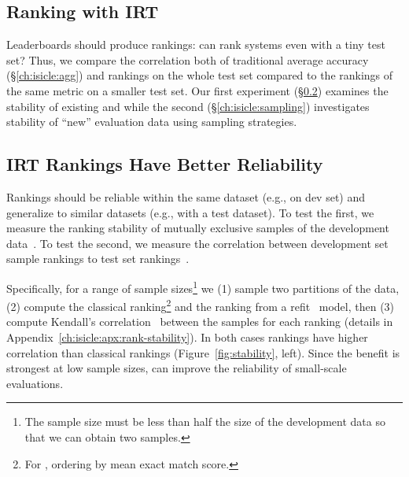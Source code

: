 \subsection{Ranking with IRT}

Leaderboards should produce  \subj{} rankings: can
\name{} rank systems even with a tiny test set?
Thus, we compare the correlation both of traditional average accuracy
(\S\ref{ch:isicle:agg}) and \irt{} rankings on the whole test
set compared to the rankings of the same metric on a smaller test set.
Our first experiment (\S\ref{ch:isicle:stable}) examines the stability
of existing \itms{} and \subjs{} while the second
(\S\ref{ch:isicle:sampling}) investigates stability of ``new''
evaluation data using sampling strategies.

\subsection{IRT Rankings Have Better Reliability}
\label{ch:isicle:stable}

\begin{figure*}[t]
    \centering
    \caption{
        Compared to the final ranking over a large test set, how well does a small test set correlate?
                The left shows correlation between mutually exclusive development set samples and the right between development samples and the full test set.
                In both experiments (panes), ranking systems by \irt{} ability is more stable---across all sample sizes---than mean accuracy and thus more reliable (Kendall's rank correlation is higher).
                Bands show 95\% confidence intervals of rank correlations across ten trials per sample size.
    }
    \label{fig:stability}
\end{figure*}

Rankings should be reliable within the same dataset (e.g., on dev
set) and generalize to similar datasets (e.g., with a test dataset).
To test the first, we measure the ranking stability of mutually
exclusive samples of the development
data~\cite{buckley2000measure}.
To test the second, we measure the correlation between
development set sample rankings to test set rankings~\citep{voorhees1998var}.

Specifically, for a range of sample sizes\footnote{ The sample size
    must be less than half the size of the development data so that we
    can obtain two samples.  } we (1) sample two partitions of the data,
(2) compute the classical ranking\footnote{For \squad{}, ordering by
    mean exact match score.} and the \irt{} ranking from a refit
~model, then (3) compute Kendall's
correlation~\citep{kendall1938tau} between the samples for each
ranking (details in Appendix~\ref{ch:isicle:apx:rank-stability}).
In both cases \irt{} rankings have higher correlation than classical
rankings (Figure~\ref{fig:stability}, left).
Since the benefit is strongest at low sample sizes, \irt{} can improve
the reliability of small-scale evaluations.

